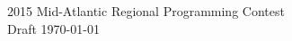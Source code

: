 \documentclass[12pt,letterpaper]{article}
\begin{document}
{\sffamily
\bfseries
\Large 
\begin{center}
\protect\rule{0pt}{1.1em}2015 Mid-Atlantic Regional Programming Contest
\\ Draft \today
\end{center}
}

\end{document}
